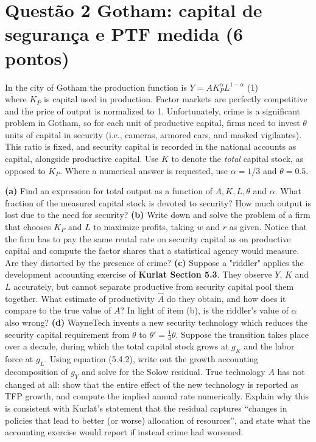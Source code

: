 \documentclass[11pt, a4paper]{article}
\begin{document}
\section[Questão 2 --- Gotham: capital de segurança e PTF medida]{Questão 2 \quad Gotham: capital de segurança e PTF medida \hfill \normalsize (6 pontos)}

\begin{tcolorbox}[questionbox]
\small
In the city of Gotham the production function is $Y = A K_P^{\alpha} L^{1-\alpha}$
\hfill (1)\\
where $K_P$ is capital used in production. Factor markets are perfectly competitive and the
price of output is normalized to 1. Unfortunately, crime is a significant problem in Gotham,
so for each unit of productive capital, firms need to invest $\theta$ units of capital in
security (i.e., cameras, armored cars, and masked vigilantes). This ratio is fixed, and
security capital is recorded in the national accounts as capital, alongside productive
capital. Use $K$ to denote the \textit{total} capital stock, as opposed to $K_P$. Where a
numerical answer is requested, use $\alpha = 1/3$ and $\theta = 0.5$.

\smallskip
\textbf{(a)} Find an expression for total output as a function of $A, K, L, \theta$ and
$\alpha$. What fraction of the measured capital stock is devoted to security? How much
output is lost due to the need for security?
\textbf{(b)} Write down and solve the problem of a firm that chooses $K_P$ and $L$ to
maximize profits, taking $w$ and $r$ as given. Notice that the firm has to pay the same
rental rate on security capital as on productive capital and compute the factor shares that
a statistical agency would measure. Are they distorted by the presence of crime?
\textbf{(c)} Suppose a "riddler" applies the development accounting exercise of
\textbf{Kurlat Section 5.3}. They observe $Y$, $K$ and $L$ accurately, but cannot separate
productive from security capital pool them together. What estimate of productivity
$\hat{A}$ do they obtain, and how does it compare to the true value of $A$? In light of item
(b), is the riddler's value of $\alpha$ also wrong?
\textbf{(d)} WayneTech invents a new security technology which reduces the security capital
requirement from $\theta$ to $\theta' = \frac{1}{4}\theta$. Suppose the transition takes
place over a decade, during which the total capital stock grows at $g_K$ and the labor force
at $g_L$. Using equation (5.4.2), write out the growth accounting decomposition of $g_Y$ and
solve for the Solow residual. True technology $A$ has not changed at all: show that the
entire effect of the new technology is reported as TFP growth, and compute the implied
annual rate numerically. Explain why this is consistent with Kurlat's statement that the
residual captures ``changes in policies that lead to better (or worse) allocation of
resources'', and state what the accounting exercise would report if instead crime had
worsened.
\end{tcolorbox}
\end{document}
